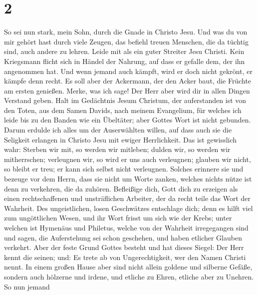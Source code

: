 \hypertarget{section-1}{%
\section{2}\label{section-1}}

 So sei nun stark, mein Sohn, durch die Gnade in Christo
Jesu.  Und was du von mir gehört hast durch viele Zeugen,
das befiehl treuen Menschen, die da tüchtig sind, auch andere zu lehren.
 Leide mit als ein guter Streiter Jesu Christi.
 Kein Kriegsmann flicht sich in Händel der Nahrung, auf
dass er gefalle dem, der ihn angenommen hat.  Und wenn
jemand auch kämpft, wird er doch nicht gekrönt, er kämpfe denn recht.
 Es soll aber der Ackermann, der den Acker baut, die
Früchte am ersten genießen. Merke, was ich sage!  Der Herr
aber wird dir in allen Dingen Verstand geben.  Halt im
Gedächtnis Jesum Christum, der auferstanden ist von den Toten, aus dem
Samen Davids, nach meinem Evangelium,  für welches ich
leide bis zu den Banden wie ein Übeltäter; aber Gottes Wort ist nicht
gebunden.  Darum erdulde ich alles um der Auserwählten
willen, auf dass auch sie die Seligkeit erlangen in Christo Jesu mit
ewiger Herrlichkeit.  Das ist gewisslich wahr: Sterben
wir mit, so werden wir mitleben;  dulden wir, so werden
wir mitherrschen; verleugnen wir, so wird er uns auch verleugnen;
 glauben wir nicht, so bleibt er treu; er kann sich
selbst nicht verleugnen.  Solches erinnere sie und
bezeuge vor dem Herrn, dass sie nicht um Worte zanken, welches nichts
nütze ist denn zu verkehren, die da zuhören.  Befleißige
dich, Gott dich zu erzeigen als einen rechtschaffenen und unsträflichen
Arbeiter, der da recht teile das Wort der Wahrheit.  Des
ungeistlichen, losen Geschwätzes entschlage dich; denn es hilft viel zum
ungöttlichen Wesen,  und ihr Wort frisst um sich wie der
Krebs; unter welchen ist Hymenäus und Philetus,  welche
von der Wahrheit irregegangen sind und sagen, die Auferstehung sei schon
geschehen, und haben etlicher Glauben verkehrt.  Aber der
feste Grund Gottes besteht und hat dieses Siegel: Der Herr kennt die
seinen; und: Es trete ab von Ungerechtigkeit, wer den Namen Christi
nennt.  In einem großen Hause aber sind nicht allein
goldene und silberne Gefäße, sondern auch hölzerne und irdene, und
etliche zu Ehren, etliche aber zu Unehren.  So nun jemand
